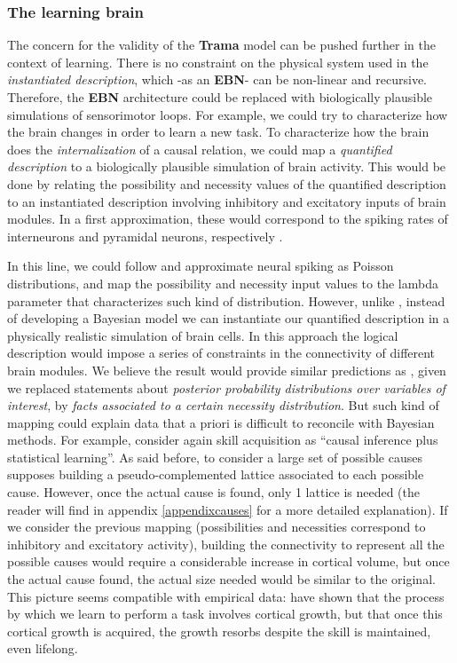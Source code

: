 \documentclass[
		twoside,openright,titlepage,numbers=noenddot,manychapters,
		headinclude,%
                footinclude=false,cleardoublepage=empty,
                BCOR=5mm,
		fontsize=11pt, %
                 enabledeprecatedfontcommands]{scrreprt}
\begin{document}
\subsubsection{The learning brain}
The concern for the validity of the \textbf{Trama} model can be pushed further in the context of learning. There is no constraint on the physical system used in the \emph{instantiated description}, which -as an \textbf{EBN}- can be non-linear and recursive. Therefore, the \textbf{EBN} architecture could be replaced with biologically plausible simulations of sensorimotor loops. For example, we could try to characterize how the brain changes in order to learn a new task. To characterize how the brain does the \emph{internalization} of a causal relation, we could map a \emph{quantified description} to a biologically plausible simulation of brain activity. This would be done by relating the possibility and necessity values of the quantified description to an instantiated description involving inhibitory and excitatory inputs of brain modules. In a first approximation, these would correspond to the spiking rates of interneurons and pyramidal neurons, respectively \cite[]{buzsaki2006rb}.

In this line, we could follow \cite{beck2008a} and approximate neural spiking as Poisson distributions, and map the possibility and necessity input values to the lambda parameter that characterizes such kind of distribution. However, unlike \cite{beck2008a}, instead of developing a Bayesian model we can instantiate our quantified description in a physically realistic simulation of brain cells. In this approach the logical description would impose a series of constraints in the connectivity of different brain modules. We believe the result would provide similar predictions as \cite{beck2008a}, given we replaced statements about \emph{posterior probability distributions over variables of interest}, by \emph{facts associated to a certain necessity distribution}. But such kind of mapping could explain data that a priori is difficult to reconcile with Bayesian methods. For example, consider again skill acquisition as ``causal inference plus statistical learning''. As said before, to consider a large set of possible causes supposes building a pseudo-complemented lattice associated to each possible cause. However, once the actual cause is found, only 1 lattice is needed (the reader will find in appendix \ref{appendixcauses} for a more detailed explanation). If we consider the previous mapping (possibilities and necessities correspond to inhibitory and excitatory activity), building the connectivity to represent all the possible causes would require a considerable increase in cortical volume, but once the actual cause found, the actual size needed would be similar to the original. This picture seems compatible with empirical data: \cite{Reed2011} have shown that the process by which we learn to perform a task involves cortical growth, but that once this cortical growth is acquired, the growth resorbs despite the skill is maintained, even lifelong.
\end{document}
